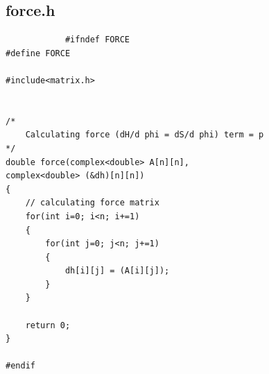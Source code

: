 \documentclass[12pt, letterpaper]{article}
\begin{document}
    \begin{mdframed}[style=MyFrame]
        \subsection*{force.h}
        \begin{verbatim}
            #ifndef FORCE
#define FORCE

#include<matrix.h>


/* 
    Calculating force (dH/d phi = dS/d phi) term = p
*/
double force(complex<double> A[n][n], 
complex<double> (&dh)[n][n])
{
    // calculating force matrix
    for(int i=0; i<n; i+=1)
    {
        for(int j=0; j<n; j+=1)
        {
            dh[i][j] = (A[i][j]); 
        }
    }

    return 0;
}

#endif
        \end{verbatim}        
    \end{mdframed}
\end{document}

